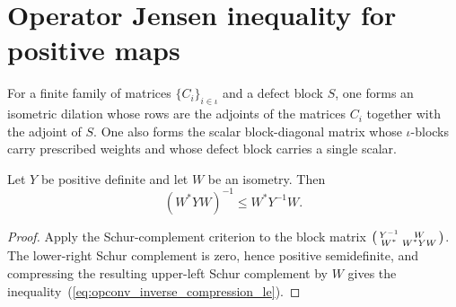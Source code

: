 \section{Operator Jensen inequality for positive maps}

\begin{definition}\label{def:operator_jensen_povm_aux}
    \leanok
    For a finite family of matrices $\{C_i\}_{i \in \iota}$ and a defect block
    $S$, one forms an isometric dilation whose rows are the adjoints of the
    matrices $C_i$ together with the adjoint of $S$. One also forms the scalar
    block-diagonal matrix whose $\iota$-blocks carry prescribed weights and
    whose defect block carries a single scalar.
\end{definition}

\begin{lemma}\label{lem:operator_jensen_inverse_compression}
    \leanok
    Let $Y$ be positive definite and let $W$ be an isometry. Then
    \begin{equation}\label{eq:opconv_inverse_compression_le}
        (W^\ast Y W)^{-1} \le W^\ast Y^{-1} W.
    \end{equation}
\end{lemma}

\begin{proof}
    \leanok
    Apply the Schur-complement criterion to the block matrix
    $\begin{psmallmatrix} Y^{-1} & W \\ W^\ast & W^\ast Y W \end{psmallmatrix}$.
    The lower-right Schur complement is zero, hence positive semidefinite, and
    compressing the resulting upper-left Schur complement by $W$ gives the
    inequality~(\ref{eq:opconv_inverse_compression_le}).
\end{proof}


